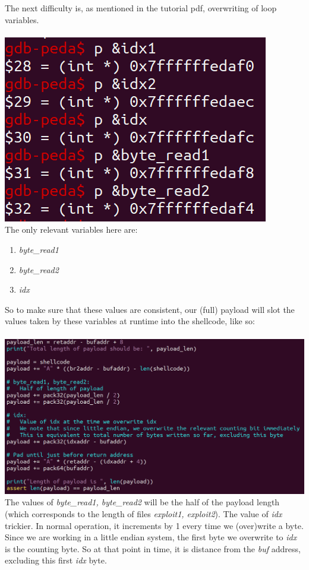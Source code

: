 \documentclass[12pt]{article}
\begin{document}
The next difficulty is, as mentioned in the tutorial pdf, overwriting of loop variables.\\\\
\includegraphics[scale=0.7]{./a2/buffer_overflow/extravariables.PNG}\\

The only relevant variables here are:
\begin{enumerate}
    \item \emph{byte\_read1}
    \item \emph{byte\_read2}
    \item \emph{idx}
\end{enumerate}
So to make sure that these values are consistent, our (full) payload will slot the values taken by these variables at runtime into the shellcode, like so:\\\\
\includegraphics[scale=0.5]{./a2/buffer_overflow/extravariablesexploit.PNG}\\

The values of \emph{byte\_read1, byte\_read2} will be the half of the payload length (which corresponds to the length of files \emph{exploit1, exploit2}). The value of \emph{idx} trickier. In normal operation, it increments by 1 every time we (over)write a byte. Since we are working in a little endian system, the first byte we overwrite to \emph{idx} is the counting byte. So at that point in time, it is distance from the \emph{buf} address, excluding this first \emph{idx} byte.\\
\end{document}
